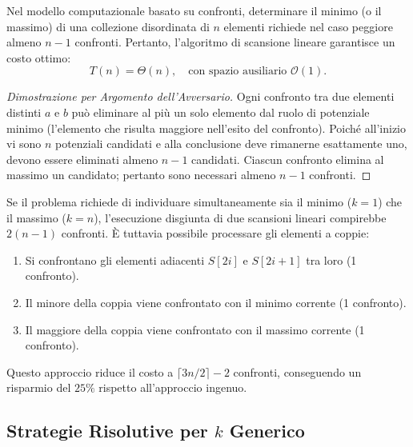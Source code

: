 \begin{property}[Ottimalità Asintotica per $k = 1$ e $k = n$]
Nel modello computazionale basato su confronti, determinare il minimo (o il massimo) di una collezione disordinata di $n$ elementi richiede nel caso peggiore almeno $n - 1$ confronti. Pertanto, l'algoritmo di scansione lineare garantisce un costo ottimo:
\begin{equation}
  T(n) = \Theta(n), \quad \text{con spazio ausiliario } \mathcal{O}(1).
\end{equation}
\end{property}

\begin{proof}[Dimostrazione per Argomento dell'Avversario]
Ogni confronto tra due elementi distinti $a$ e $b$ può eliminare al più un solo elemento dal ruolo di potenziale minimo (l'elemento che risulta maggiore nell'esito del confronto). Poiché all'inizio vi sono $n$ potenziali candidati e alla conclusione deve rimanerne esattamente uno, devono essere eliminati almeno $n - 1$ candidati. Ciascun confronto elimina al massimo un candidato; pertanto sono necessari almeno $n - 1$ confronti.
\end{proof}

\begin{property}
Se il problema richiede di individuare simultaneamente sia il minimo ($k=1$) che il massimo ($k=n$), l'esecuzione disgiunta di due scansioni lineari compirebbe $2(n - 1)$ confronti. È tuttavia possibile processare gli elementi a coppie:
\begin{enumerate}
  \item Si confrontano gli elementi adiacenti $S[2i]$ e $S[2i+1]$ tra loro (1 confronto).
  \item Il minore della coppia viene confrontato con il minimo corrente (1 confronto).
  \item Il maggiore della coppia viene confrontato con il massimo corrente (1 confronto).
\end{enumerate}
Questo approccio riduce il costo a $\lceil 3n/2 \rceil - 2$ confronti, conseguendo un risparmio del $25\%$ rispetto all'approccio ingenuo.
\end{property}
\FloatBarrier

\subsection{Strategie Risolutive per $k$ Generico}
\label{subsec:selection-general-strategies}

